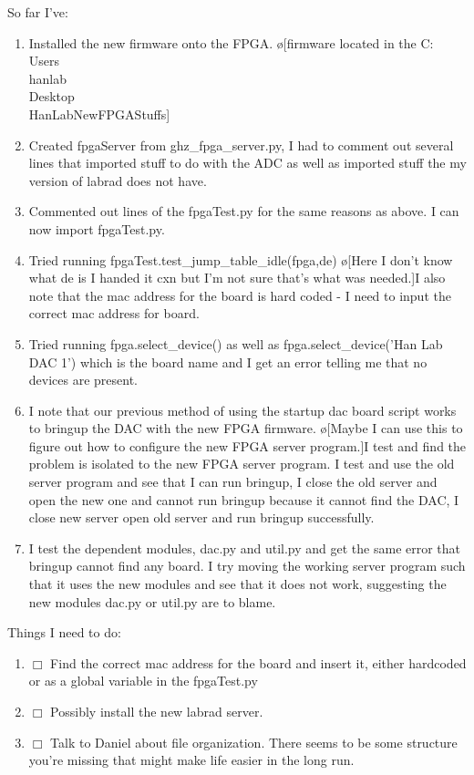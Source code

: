 \documentclass[10pt]{book}
\begin{document}
So far I've:
\begin{enumerate}
    \item Installed the new firmware onto the FPGA. \o[firmware located in the C:\\Users\\hanlab\\Desktop\\HanLabNewFPGAStuffs]{}
    \item Created fpgaServer from ghz\_fpga\_server.py, I had to comment out several lines that imported stuff to do with the ADC as well as imported stuff the my version of labrad does not have.
    \item Commented out lines of the fpgaTest.py for the same reasons as above. I can now import fpgaTest.py.
    \item Tried running fpgaTest.test\_jump\_table\_idle(fpga,de) \o[Here I don't know what de is I handed it cxn but I'm not sure that's what was needed.]{I also note that the mac address for the board is hard coded - I need to input the correct mac address for board.}
    \item Tried running fpga.select\_device() as well as fpga.select\_device('Han Lab DAC 1') which is the board name and I get an error telling me that no devices are present.
    \item I note that our previous method of using the startup dac board script works to bringup the DAC with the new FPGA firmware. \o[Maybe I can use this to figure out how to configure the new FPGA server program.]{I test and find the problem is isolated to the new FPGA server program. I test and use the old server program and see that I can run bringup, I close the old server and open the new one and cannot run bringup because it cannot find the DAC, I close new server open old server and run bringup successfully.}
    \item I test the dependent modules, dac.py and util.py and get the same error that bringup cannot find any board. I try moving the working server program such that it uses the new modules and see that it does not work, suggesting the new modules dac.py or util.py are to blame.
\end{enumerate}


Things I need to do:
\begin{enumerate}
    \item $\Box$ Find the correct mac address for the board and insert it, either hardcoded or as a global variable in the fpgaTest.py
    \item $\Box$ Possibly install the new labrad server.
    \item $\Box$ Talk to Daniel about file organization. There seems to be some structure you're missing that might make life easier in the long run.
      
\end{enumerate}
\end{document}
